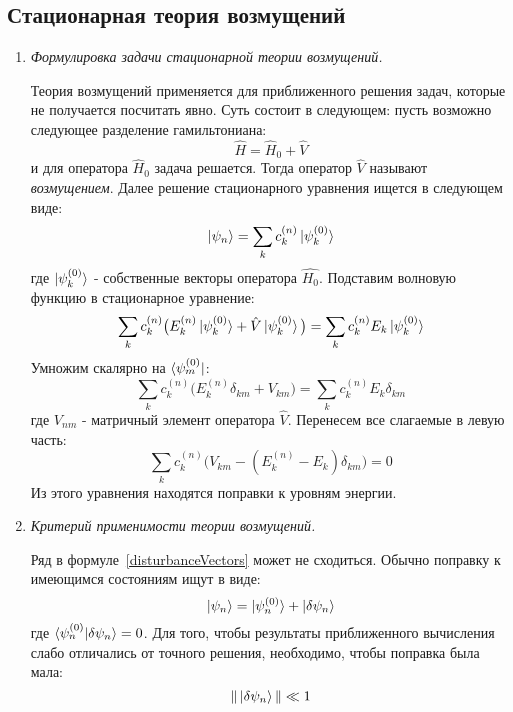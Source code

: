 \documentclass{article}
\begin{document}
\subsection*{Стационарная теория возмущений}
	\begin{enumerate}
		\item \textit{Формулировка задачи стационарной теории возмущений.}
		
		Теория возмущений применяется для приближенного решения задач, которые не получается посчитать явно. Суть состоит в следующем: пусть возможно следующее разделение гамильтониана:
		\begin{equation}
			\hat{H} = \hat{H}_0 + \hat{V}
		\end{equation}
		и для оператора $\hat{H}_0$ задача решается. Тогда оператор $\hat{V}$ называют \textit{возмущением}. Далее решение стационарного уравнения ищется в следующем виде:
		\begin{equation}
			\ket{\psi_n} = \sum\limits_{k} c_k^{(n)} \ket{\psi_k^{(0)}} \label{disturbanceVectors}
		\end{equation}
		где $\ket{\psi_k^{(0)}}$ - собственные векторы оператора $\hat{H_0}$. Подставим волновую функцию в стационарное уравнение:
		\begin{equation}
			\sum\limits_{k}c_k^{(n)}\big(E_k^{(n)} \ket{\psi_k^{(0)}} + \hat{V}\ket{\psi_k^{(0)}}\big) = \sum\limits_{k}c_k^{(n)}E_k \ket{\psi_k^{(0)}}
		\end{equation}
		Умножим скалярно на $\bra{\psi_m^{(0)}}$:
		\begin{equation}
			\sum\limits_{k}c_k^{(n)}\big(E_k^{(n)} \delta_{km} + V_{km}\big) = \sum\limits_{k}c_k^{(n)}E_k \delta_{km}
		\end{equation}
		где $V_{nm}$ - матричный элемент оператора $\hat{V}$. Перенесем все слагаемые в левую часть:
		\begin{equation}
			\sum\limits_{k}c_k^{(n)}\big(V_{km} - (E_k^{(n)} - E_k) \delta_{km}\big) = 0
		\end{equation}
		Из этого уравнения находятся поправки к уровням энергии.
		
		\item \textit{Критерий применимости теории возмущений.}
		
		Ряд в формуле~\eqref{disturbanceVectors} может не сходиться. Обычно поправку к имеющимся состояниям ищут в виде:
		\begin{equation}
			\ket{\psi_n} = \ket{\psi_n^{(0)}} + \ket{\delta \psi_n}
		\end{equation}
		где $\braket{\psi_n^{(0)}|\delta \psi_n} = 0$. Для того, чтобы результаты приближенного вычисления слабо отличались от точного решения, необходимо, чтобы поправка была мала:
		\begin{equation}
			\|\ket{\delta \psi_n}\| \ll 1
		\end{equation}
		

\end{enumerate}
\end{document}
